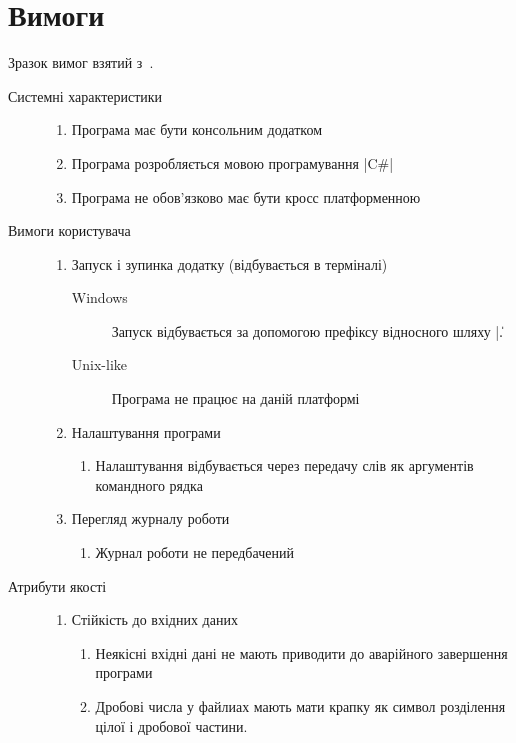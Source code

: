 \section{Вимоги}
Зразок вимог взятий з~\cite{kulikov}. 
\begin{description}
	\item[Системні характеристики]\directenv%
		\begin{enumerate}
			\item Програма має бути консольним додатком
			\item Програма розробляється мовою програмування \textinline|C#| 
			\item Програма не обов'язково має бути кросс платформенною
		\end{enumerate}
	\item[Вимоги користувача]\directenv%
		\begin{enumerate}
			\item Запуск і зупинка додатку (відбувається в терміналі)
				\begin{description}
					\item[Windows]
						Запуск відбувається за допомогою префіксу відносного шляху \textinline|.\|
					\item[Unix-like]
						Програма не працює на даній платформі
				\end{description}
			\item Налаштування програми
				\begin{enumerate}
					\item Налаштування відбувається через передачу слів як аргументів командного рядка
				\end{enumerate}
			\item Перегляд журналу роботи
				\begin{enumerate}
					\item Журнал роботи не передбачений
				\end{enumerate}
		\end{enumerate}
	\item[Атрибути якості]\directenv%
		\begin{enumerate}
			\item Стійкість до вхідних даних
				\begin{enumerate}
					\item Неякісні вхідні дані не мають приводити до аварійного завершення програми
					\item Дробові числа у  файлиах мають мати крапку як символ розділення цілої
						і дробової частини.

\end{enumerate}
\end{enumerate}
\end{description}
